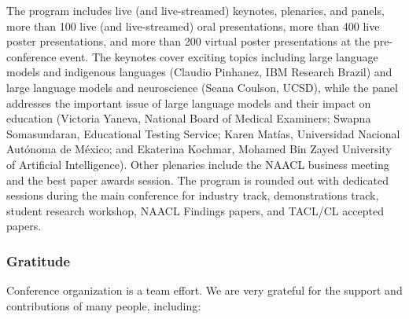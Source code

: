 The program includes live (and live-streamed) keynotes, plenaries, and panels, more than 100 live (and live-streamed) oral presentations, more than 400 live poster presentations, and more than 200 virtual poster presentations at the pre-conference event. The keynotes cover exciting topics including large language models and indigenous languages (Claudio Pinhanez, IBM Research Brazil) and large language models and neuroscience (Seana Coulson, UCSD), while the panel addresses the important issue of large language models and their impact on education (Victoria Yaneva, National Board of Medical Examiners; Swapna Somasundaran, Educational Testing Service; Karen Matías, Universidad Nacional Autónoma de México; and Ekaterina Kochmar, Mohamed Bin Zayed University of Artificial Intelligence). Other plenaries include the NAACL business meeting and the best paper awards session. The program is rounded out with dedicated sessions during the main conference for industry track, demonstrations track, student research workshop, NAACL Findings papers, and TACL/CL accepted papers.

\subsubsection*{Gratitude}
Conference organization is a team effort. We are very grateful for the support and contributions of many people, including: 

